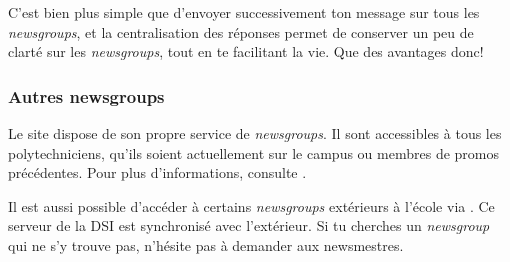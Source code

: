 C'est bien plus simple que d'envoyer successivement ton message sur tous les \emph{newsgroups}, et la centralisation des réponses permet de conserver
un peu de clarté sur les \emph{newsgroups}, tout en te facilitant la vie. Que des avantages donc!


\subsubsection{Autres newsgroups}
Le site  dispose de son propre service de \emph{newsgroups}. Il sont
accessibles à tous les polytechniciens, qu'ils soient actuellement sur le campus ou membres de
promos précédentes. Pour plus d'informations, consulte .

Il est aussi possible d'accéder à certains \emph{newsgroups} extérieurs à l'école via . Ce serveur de la DSI est synchronisé avec
l'extérieur. Si tu cherches un \emph{newsgroup} qui ne s'y trouve pas, n'hésite pas à demander aux newsmestres.